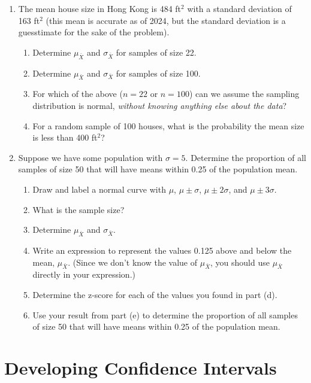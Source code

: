 \documentclass[
]{book}
\providecommand{\tightlist}{%
  \setlength{\itemsep}{0pt}\setlength{\parskip}{0pt}}
\begin{document}
\begin{enumerate}
\def\labelenumi{\arabic{enumi}.}
\tightlist
\item
  The mean house size in Hong Kong is 484 ft\(^2\) with a standard deviation of 163 ft\(^2\) (this mean is accurate as of 2024, but the standard deviation is a guesstimate for the sake of the problem).

  \begin{enumerate}
  \def\labelenumii{\alph{enumii}.}
  \tightlist
  \item
    Determine \(\mu_{\bar{X}}\) and \(\sigma_{\bar{X}}\) for samples of size 22.
  \item
    Determine \(\mu_{\bar{X}}\) and \(\sigma_{\bar{X}}\) for samples of size 100.
  \item
    For which of the above (\(n=22\) or \(n=100\)) can we assume the sampling distribution is normal, \emph{without knowing anything else about the data}?
  \item
    For a random sample of 100 houses, what is the probability the mean size is less than 400 ft\(^2\)?
  \end{enumerate}
\item
  Suppose we have some population with \(\sigma=5\). Determine the proportion of all samples of size 50 that will have means within 0.25 of the population mean.

  \begin{enumerate}
  \def\labelenumii{\alph{enumii}.}
  \tightlist
  \item
    Draw and label a normal curve with \(\mu\), \(\mu\pm\sigma\), \(\mu\pm 2\sigma\), and \(\mu\pm 3\sigma\).
  \item
    What is the sample size?
  \item
    Determine \(\mu_{\bar{X}}\) and \(\sigma_{\bar{X}}\).
  \item
    Write an expression to represent the values 0.125 above and below the mean, \(\mu_{\bar{X}}\). (Since we don't know the value of \(\mu_{\bar{X}}\), you should use \(\mu_{\bar{X}}\) directly in your expression.)
  \item
    Determine the z-score for each of the values you found in part (d).
  \item
    Use your result from part (e) to determine the proportion of all samples of size 50 that will have means within 0.25 of the population mean.
  \end{enumerate}
\end{enumerate}

\section{Developing Confidence Intervals}\label{developing-confidence-intervals}
\end{document}
